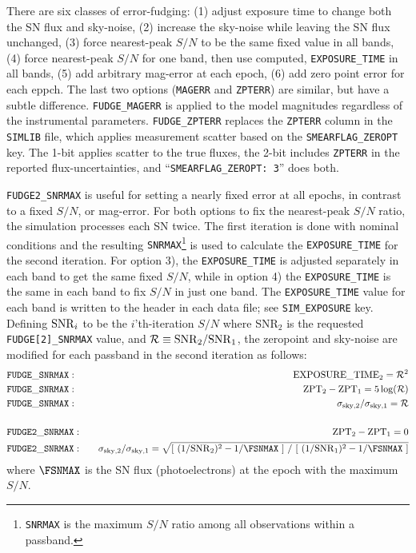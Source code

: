 \documentclass[12pt]{article}
\newcommand{\uncs}{uncertainties}
\begin{document}
There are six classes of error-fudging:
(1) adjust exposure time to change both the SN flux and sky-noise,
(2) increase the sky-noise while leaving the SN flux unchanged, 
(3) force nearest-peak $S/N$ to be the same fixed value in all bands,
(4) force nearest-peak $S/N$ for one band, then use computed,
  {\tt EXPOSURE\_TIME} in all bands,
(5) add arbitrary mag-error at each epoch,
(6) add zero point error for each eppch.
%
The last two options ({\tt MAGERR} and {\tt ZPTERR}) are similar,
but have a subtle difference. {\tt FUDGE\_MAGERR} is applied to 
the model magnitudes regardless of the instrumental parameters.
{\tt FUDGE\_ZPTERR} replaces the {\tt ZPTERR} column in the
{\tt SIMLIB} file, which applies measurement scatter based on the
{\tt SMEARFLAG\_ZEROPT} key. The 1-bit applies scatter to 
the true fluxes, the 2-bit includes {\tt ZPTERR} in the reported
flux-\uncs, and ``{\tt SMEARFLAG\_ZEROPT: 3}'' does both.


{\tt FUDGE2\_SNRMAX} is useful for setting a nearly fixed 
error at all epochs, in contrast to a fixed $S/N$, or mag-error.
For both options to fix the nearest-peak $S/N$ ratio, 
the simulation processes each SN twice. The first iteration 
is done with nominal conditions and the resulting 
{\tt SNRMAX}\footnote{{\tt SNRMAX} is the maximum $S/N$ 
ratio among all observations within a passband.}
is used to calculate the {\tt EXPOSURE\_TIME} for the second iteration.
For option 3), the {\tt EXPOSURE\_TIME} is adjusted separately
in each band to get the same fixed $S/N$, while in option 4)
the {\tt EXPOSURE\_TIME} is the same in each band to fix $S/N$
in just one band. The {\tt EXPOSURE\_TIME} value for each band
is written to the header in each data file; see {\tt SIM\_EXPOSURE} key.
Defining ${\rm SNR}_i$ to be the $i$'th-iteration $S/N$
where SNR$_2$ is the requested {\tt FUDGE[2]\_SNRMAX} value,
and ${\cal R} \equiv {\rm SNR}_2/{\rm SNR}_1$,
the zeropoint and sky-noise are modified for each passband
in the second iteration as follows:
%
\begin{eqnarray}
 & {\tt FUDGE\_SNRMAX:} & ~~~{\rm EXPOSURE\_TIME}_2    =  {\cal R}^2 \\
 & {\tt FUDGE\_SNRMAX:} & ~~~{\rm ZPT}_2 - {\rm ZPT}_1 = 5\log({\cal R}) \\
 & {\tt FUDGE\_SNRMAX}: & ~~~ \sigma_{\rm sky,2}/\sigma_{\rm sky,1}  
                             =  {\cal R}   \\
%
     & & \nonumber\\
%
 &{\tt FUDGE2\_SNRMAX}: &~~~{\rm ZPT}_2 - {\rm ZPT}_1  =  0         \\
 & {\tt FUDGE2\_SNRMAX}: &~~~\sigma_{\rm sky,2}/\sigma_{\rm sky,1}  = 
    \sqrt{[~(1/{\rm SNR}_2)^2 - 1/{\FSNMAX} ~ ] ~/~
          [~(1/{\rm SNR}_1)^2 - 1/{\FSNMAX} ~ ]  }
\end{eqnarray}
%
where $\FSNMAX$ is the SN flux (photoelectrons)
at the epoch with the maximum $S/N$.
\end{document}
